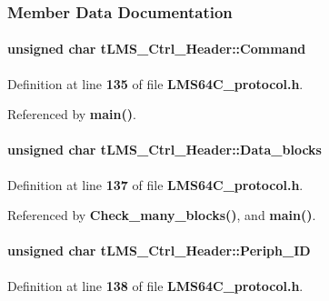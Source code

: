 \subsubsection{Member Data Documentation}
\paragraph[{Command}]{\setlength{\rightskip}{0pt plus 5cm}unsigned char t\+L\+M\+S\+\_\+\+Ctrl\+\_\+\+Header\+::\+Command}\label{structtLMS__Ctrl__Header_aeea11e071fd4b517faead47825eb5657}


Definition at line {\bf 135} of file {\bf L\+M\+S64\+C\+\_\+protocol.\+h}.



Referenced by {\bf main()}.

\paragraph[{Data\+\_\+blocks}]{\setlength{\rightskip}{0pt plus 5cm}unsigned char t\+L\+M\+S\+\_\+\+Ctrl\+\_\+\+Header\+::\+Data\+\_\+blocks}\label{structtLMS__Ctrl__Header_ad4338e3f5a500dc79a11b2524e92f63f}


Definition at line {\bf 137} of file {\bf L\+M\+S64\+C\+\_\+protocol.\+h}.



Referenced by {\bf Check\+\_\+many\+\_\+blocks()}, and {\bf main()}.

\paragraph[{Periph\+\_\+\+ID}]{\setlength{\rightskip}{0pt plus 5cm}unsigned char t\+L\+M\+S\+\_\+\+Ctrl\+\_\+\+Header\+::\+Periph\+\_\+\+ID}\label{structtLMS__Ctrl__Header_a57d64e436cf649a0d48f0e2398c5d7be}


Definition at line {\bf 138} of file {\bf L\+M\+S64\+C\+\_\+protocol.\+h}.



